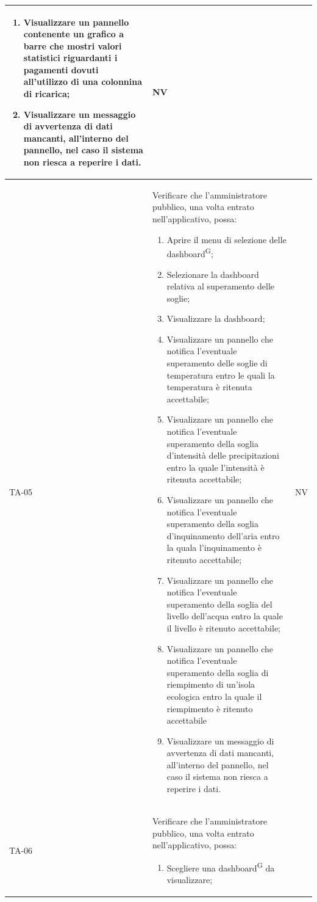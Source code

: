 \documentclass[8pt]{article}
\newcommand{\glossterm}[1]{#1\textsuperscript{G}} %
\begin{document}
\begin{longtable}{|>{\centering}p{2cm}|>{\RaggedRight}m{12cm}|>{\centering\arraybackslash}p{2cm}|}
\begin{enumerate}
        \item Visualizzare un pannello contenente un grafico a barre che mostri valori statistici riguardanti i pagamenti dovuti all'utilizzo di una colonnina di ricarica;
        \item Visualizzare un messaggio di avvertenza di dati mancanti, all’interno del pannello, nel caso il sistema non riesca a reperire i dati.
    \end{enumerate}
    & NV \\
    \hline
    TA-05 & Verificare che l'amministratore pubblico, una volta entrato nell'applicativo, possa:
    \begin{enumerate}
        \setlength\itemsep{0em}
        \item Aprire il menu di selezione delle \glossterm{dashboard};
        \item Selezionare la dashboard relativa al superamento delle soglie;
        \item Visualizzare la dashboard;
        \item Visualizzare un pannello che notifica l'eventuale superamento delle soglie di temperatura entro le quali la temperatura è ritenuta accettabile;
        \item Visualizzare un pannello che notifica l'eventuale superamento della soglia d'intensità delle precipitazioni entro la quale l'intensità è ritenuta accettabile;
        \item Visualizzare un pannello che notifica l'eventuale superamento della soglia d'inquinamento dell'aria entro la quala l'inquinamento è ritenuto accettabile;
        \item Visualizzare un pannello che notifica l'eventuale superamento della soglia del livello dell'acqua entro la quale il livello è ritenuto accettabile;
        \item Visualizzare un pannello che notifica l'eventuale superamento della soglia di riempimento di un'isola ecologica entro la quale il riempimento è ritenuto accettabile
        \item Visualizzare un messaggio di avvertenza di dati mancanti, all’interno del pannello, nel caso il sistema non riesca a reperire i dati.
    \end{enumerate}
    & NV \\
    \hline
    TA-06 & Verificare che l'amministratore pubblico, una volta entrato nell’applicativo, possa:
    \begin{enumerate}
        \item Scegliere una \glossterm{dashboard} da visualizzare;

\end{enumerate}
\end{longtable}
\end{document}
